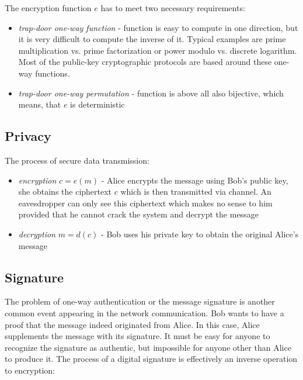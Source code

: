 \noindent
The encryption function $e$ has to meet two necessary requirements:

\begin{itemize}

\item \textit{trap-door one-way function}\cite{trapdoor} - function is easy to compute in one direction, but it is very difficult to compute the inverse of it. Typical examples are prime multiplication vs. prime factorization or power modulo vs. discrete logarithm. Most of the public-key cryptographic protocols are based around these one-way functions.

\item \textit{trap-door one-way permutation} - function is above all also bijective, which means, that $e$ is deterministic 

\end{itemize}

\subsection*{Privacy}

The process of secure data transmission:

\begin{itemize}

\item \textit{encryption} $c = e(m)$ - Alice encrypts the message using Bob's public key, she obtains the ciphertext $c$ which is then transmitted via channel. An eavesdropper can only see this ciphertext which makes no sense to him provided that he cannot crack the system and decrypt the message

\item \textit{decryption} $m = d(c)$ - Bob uses his private key to obtain the original Alice's message

\end{itemize}

\subsection*{Signature}

The problem of one-way authentication or the message signature is another common event appearing in the network communication. Bob wants to have a proof that the message indeed originated from Alice. In this case, Alice supplements the message with its signature. It must be easy for anyone to recognize the signature as authentic, but impossible for anyone other than Alice to produce it. The process of a digital signature is effectively an inverse operation to encryption:

